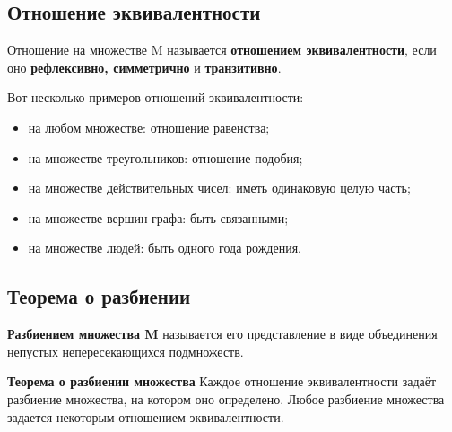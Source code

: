\documentclass[a4paper]{article}
\begin{document}
\subsection*{Отношение эквивалентности
}
Отношение на множестве M называется \textbf{отношением
эквивалентности}, если оно \textbf{рефлексивно, симметрично} и \textbf{транзитивно}.

Вот несколько примеров отношений эквивалентности:
\begin{itemize}
\item на любом множестве: отношение равенства;
\item на множестве треугольников: отношение подобия;
\item на множестве действительных чисел: иметь одинаковую целую часть;
\item на множестве вершин графа: быть связанными;
\item на множестве людей: быть одного года рождения.
\end{itemize}


\subsection*{Теорема о разбиении}
\begin{definit}
\textbf{Разбиением множества M} называется его представление в виде объединения непустых непересекающихся подмножеств.
\end{definit}

\begin{htheorem}
\textbf{Теорема о разбиении множества} 
Каждое отношение эквивалентности
задаёт разбиение множества, на котором оно определено. Любое разбиение множества задается некоторым отношением эквивалентности.
\end{htheorem}
\end{document}
